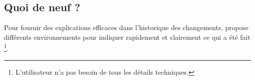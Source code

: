 \documentclass[10pt, a4paper]{article}
\begin{document}

\subsection{Quoi de neuf ?}

Pour fournir des explications efficaces dans l'historique des changements,  propose différents environnements pour indiquer rapidement et clairement ce qui a été fait
\footnote{
	L'utilisateur n'a pas besoin de tous les détails techniques.
}.


\begin{tdocexa}
	\leavevmode
	
\end{tdocexa}




\begin{tdocexa}
	\leavevmode

\end{tdocexa}




\begin{tdocexa}
	\leavevmode

\end{tdocexa}




\begin{tdocexa}
	\leavevmode

\end{tdocexa}
\end{document}
